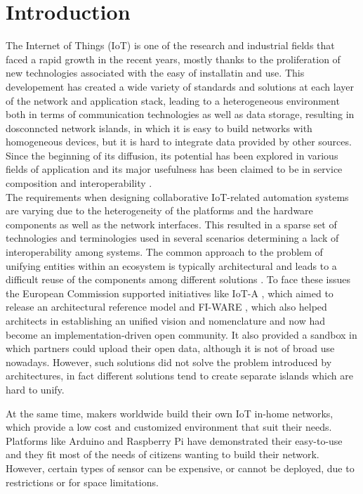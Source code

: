 \section{Introduction}
The Internet of Things (IoT) is one of the research and industrial fields that faced a rapid growth in the recent years, mostly thanks to the proliferation of new technologies associated with the easy of installatin and use. This developement has created a wide variety of standards and solutions at each layer of the network and application stack, leading to a heterogeneous environment both in terms of communication technologies as well as data storage, resulting in dosconncted network islands, in which it is easy to build networks with homogeneous devices, but it is hard to integrate data provided by other sources. Since the beginning of its diffusion, its potential has been explored in various fields of application and its major usefulness has been claimed to be in service composition and interoperability \cite{atzori2010internet}.
\\
The requirements when designing collaborative IoT-related automation systems are varying due to the heterogeneity of the platforms and the hardware components as well as the network interfaces.
This resulted in a sparse set of technologies and terminologies used in several scenarios determining a lack of interoperability among systems.
The common approach to the problem of unifying entities within an ecosystem is typically architectural and leads to a difficult reuse of the components among different solutions \cite{krco2014designing}.
To face these issues the European Commission supported initiatives like IoT-A \cite{iot-a}, which aimed to release an architectural reference model and FI-WARE \cite{fiware}, which also helped architects in establishing an unified vision and nomenclature and now had become an implementation-driven open community.
It also provided a sandbox in which partners could upload their open data, although it is not of broad use nowadays.
However, such solutions did not solve the problem introduced by architectures, in fact different solutions tend to create separate islands which are hard to unify.

At the same time, makers worldwide build their own IoT in-home networks, which provide a low cost and customized environment that suit their needs. Platforms like Arduino and Raspberry Pi have demonstrated their easy-to-use and they fit most of the needs of citizens wanting to build their network. However, certain types of sensor can be expensive, or cannot be deployed, due to restrictions or for space limitations. 

